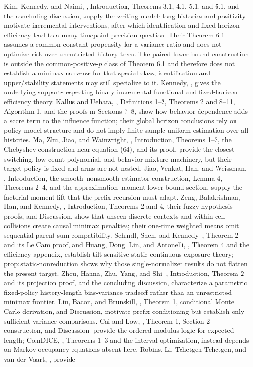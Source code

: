 \documentclass{article}
\begin{document}
Kim, Kennedy, and Naimi, \cite{KimKennedyNaimi2021}, Introduction, Theorems 3.1, 4.1, 5.1, and 6.1, and the concluding discussion, supply the writing model: long histories and positivity motivate incremental interventions, after which identification and fixed-horizon efficiency lead to a many-timepoint precision question. Their Theorem 6.1 assumes a common constant propensity for a variance ratio and does not optimize risk over unrestricted history trees. The paired lower-bound construction is outside the common-positive-\(p\) class of Theorem 6.1 and therefore does not establish a minimax converse for that special class; identification and upper/stability statements may still specialize to it. Kennedy, \cite{Kennedy2019JASA}, gives the underlying support-respecting binary incremental functional and fixed-horizon efficiency theory. Kallus and Uehara, \cite{KallusUehara2024NaturalPolicies}, Definitions 1--2, Theorems 2 and 8--11, Algorithm 1, and the proofs in Sections 7--8, show how behavior dependence adds a score term to the influence function; their global horizon conclusions rely on policy-model structure and do not imply finite-sample uniform estimation over all histories. Ma, Zhu, Jiao, and Wainwright, \cite{MaZhuJiaoWainwright2022}, Introduction, Theorems 1--3, the Chebyshev construction near equation (64), and its proof, provide the closest switching, low-count polynomial, and behavior-mixture machinery, but their target policy is fixed and arms are not nested. Jiao, Venkat, Han, and Weissman, \cite{JiaoVenkatHanWeissman2015}, Introduction, the smooth--nonsmooth estimator construction, Lemma 4, Theorems 2--4, and the approximation--moment lower-bound section, supply the factorial-moment lift that the prefix recursion must adapt. Zeng, Balakrishnan, Han, and Kennedy, \cite{ZengBalakrishnanHanKennedy2024Discrete}, Introduction, Theorems 2 and 4, their fuzzy-hypothesis proofs, and Discussion, show that unseen discrete contexts and within-cell collisions create causal minimax penalties; their one-time weighted means omit sequential parent-sum compatibility. Schindl, Shen, and Kennedy, \cite{SchindlShenKennedy2024}, Theorem 2 and its Le Cam proof, and Huang, Dong, Lin, and Antonelli, \cite{HuangDongLinAntonelli2026}, Theorem 4 and the efficiency appendix, establish tilt-sensitive static continuous-exposure theory; \(\mathrm{prop:static\text{-}nonreduction}\) shows why those single-normalizer results do not flatten the present target. Zhou, Hanna, Zhu, Yang, and Shi, \cite{ZhouHannaZhuYangShi2025}, Introduction, Theorem 2 and its projection proof, and the concluding discussion, characterize a parametric fixed-policy history-length bias-variance tradeoff rather than an unrestricted minimax frontier. Liu, Bacon, and Brunskill, \cite{LiuBaconBrunskill2020}, Theorem 1, conditional Monte Carlo derivation, and Discussion, motivate prefix conditioning but establish only sufficient variance comparisons. Cai and Low, \cite{CaiLow2004}, Theorem 1, Section 2 construction, and Discussion, provide the ordered-modulus logic for expected length; CoinDICE, \cite{DaiEtAl2020CoinDICE}, Theorems 1--3 and the interval optimization, instead depends on Markov occupancy equations absent here. Robins, Li, Tchetgen Tchetgen, and van der Vaart, \cite{RobinsLiTchetgenVanderVaart2016TR}, provide 
\end{document}

